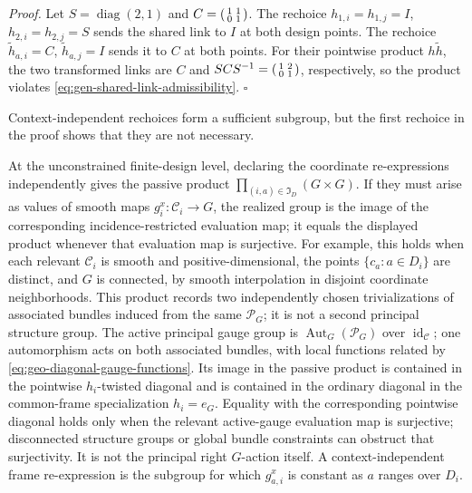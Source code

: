 \noindent\emph{Proof.}
Let $S=\operatorname{diag}(2,1)$ and
$C=\begin{psmallmatrix}1&1\\0&1\end{psmallmatrix}$.  The rechoice
$h_{1,i}=h_{1,j}=I$, $h_{2,i}=h_{2,j}=S$ sends the shared link to $I$ at both design points.
The rechoice $\widetilde h_{a,i}=C$, $\widetilde h_{a,j}=I$ sends it to $C$ at both points.
For their pointwise product $h\widetilde h$, the two transformed links are $C$ and
$SCS^{-1}=\begin{psmallmatrix}1&2\\0&1\end{psmallmatrix}$, respectively, so the product violates
\eqref{eq:gen-shared-link-admissibility}. \hfill$\square$

Context-independent rechoices form a sufficient subgroup, but the first
rechoice in the proof shows that they are not necessary. 

At the unconstrained finite-design level, declaring the coordinate re-expressions independently
gives the passive product $\prod_{(i,a)\in\mathfrak I_D}(G\times G)$. If they must arise as values of smooth maps
$g_i^x:\mathcal C_i\to G$, the realized group is the image of the corresponding
incidence-restricted evaluation map; it equals the displayed product whenever that evaluation map
is surjective. For example, this holds when each relevant $\mathcal C_i$ is smooth and
positive-dimensional, the points $\{c_a:a\in D_i\}$ are distinct, and $G$ is connected, by smooth
interpolation in disjoint coordinate neighborhoods. This product records two independently chosen
trivializations of associated bundles induced from the same $\mathscr P_G$; it is not a second principal
structure group. The active principal gauge group is $\operatorname{Aut}_G(\mathscr P_G)$ over
$\operatorname{id}_{\mathcal C}$; one automorphism acts on both associated bundles, with local
functions related by \eqref{eq:geo-diagonal-gauge-functions}.  Its image in the passive product is
contained in the pointwise $h_i$-twisted diagonal and is contained in the ordinary diagonal in the
common-frame specialization $h_i=e_G$.  Equality with the corresponding pointwise diagonal holds
only when the relevant active-gauge evaluation map is surjective; disconnected structure groups
or global bundle constraints can obstruct that surjectivity.  It is not the principal right
$G$-action itself. A
context-independent frame re-expression is the subgroup for which $g_{a,i}^x$ is constant as
$a$ ranges over $D_i$.
\label{def:gen-product-action}

